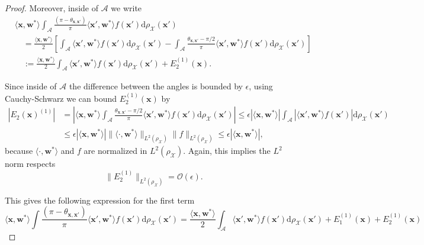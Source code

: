 \begin{proof}
    Moreover, inside of $\mathcal{A}$ we write
    \begin{align*}
        &\langle\bm x, \bm w^*\rangle\int_{\mathcal{A}} \frac{(\pi - \theta_{\bm x, \bm x'})}{\pi}\langle \bm x', \bm w^*\rangle f(\bm x')\mathrm d\rho_{\mathcal X}(\bm x') \\
        & \quad=\frac{\langle\bm x, \bm w^*\rangle}{2} \left[ \int_{\mathcal{A}} \langle \bm x', \bm w^*\rangle f(\bm x')\mathrm d\rho_{\mathcal X}(\bm x') - \int_{\mathcal{A}}  \frac{\theta_{\bm x, \bm x'} - \pi/2}{\pi}\langle \bm x', \bm w^*\rangle f(\bm x')\mathrm d\rho_{\mathcal X}(\bm x')\right]\\
        &\quad := \frac{\langle\bm x, \bm w^*\rangle}{2}\int_{\mathcal{A}} \langle \bm x', \bm w^*\rangle f(\bm x')\mathrm d\rho_{\mathcal X}(\bm x') + E_2^{(1)}(\bm x).
    \end{align*}
    
    Since inside of $\mathcal{A}$ the difference between the angles is bounded by $\epsilon$, using Cauchy-Schwarz we can bound $E_2^{(1)}(\bm x)$ by
    \begin{align*}
        |E_2(\bm x)^{(1)}| &= \left|\langle\bm x, \bm w^*\rangle \int_{\mathcal{A}}  \frac{\theta_{\bm x, \bm x'} - \pi/2}{\pi}\langle \bm x', \bm w^*\rangle f(\bm x')\mathrm d\rho_{\mathcal X}(\bm x')\right| \leq \epsilon|\langle\bm x, \bm w^*\rangle| \int_{\mathcal{A}} |\langle \bm x', \bm w^*\rangle f(\bm x')|\mathrm d\rho_{\mathcal X}(\bm x') \\
        &\leq \epsilon |\langle\bm x, \bm w^*\rangle| \| \langle \cdot, \bm w^*\rangle \|_{L^2(\rho_{\mathcal X})}\| f\|_{L^2(\rho_{\mathcal X})} \leq \epsilon|\langle\bm x, \bm w^*\rangle|,        
    \end{align*}
    because $\langle \cdot, \bm w^*\rangle$ and $f$ are normalized in $L^2(\rho_{\mathcal X})$. Again, this implies the $L^2$ norm respects
    \[
        \|E_2^{(1)}\|_{L^2(\rho_{\mathcal X})} = \mathcal O(\epsilon).
    \]
    
    This gives the following expression for the first term
    \[
        \langle \bm x, \bm w^*\rangle\int \frac{(\pi - \theta_{\bm x, \bm x'})}{\pi}\langle \bm x', \bm w^*\rangle f(\bm x')\mathrm d\rho_{\mathcal X}(\bm x') = \frac{\langle \bm x, \bm w^*\rangle}{2}\int_{\mathcal{A}} \langle \bm x', \bm w^*\rangle f(\bm x')\mathrm d\rho_{\mathcal X}(\bm x') + E_1^{(1)}(\bm x) + E_2^{(1)}(\bm x)
    \]
    

\end{proof}

